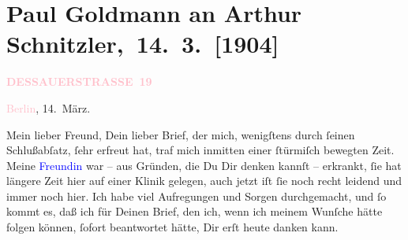 

\renewcommand{\erwaehntePersonen}{Personen: Theodore Rottenberg, Olga Schnitzler, Heinrich Schnitzler}
\renewcommand{\erwaehnteOrte}{Orte: Berlin, Dessauer Straße, Deutsches Theater Berlin, Italien, Neapel, Palermo, Pompei, Rom, Sizilien, Taormina, Wien}
\renewcommand{\erwaehnteWerke}{Werke: Berliner Theater. »Der einsame Weg«. Von Arthur Schnitzler, Der einsame Weg. Schauspiel in fünf Akten, Neue Freie Presse}
\section[ Paul Goldmann an Arthur Schnitzler, 14. 3. {[}1904{]}]{Paul Goldmann an Arthur Schnitzler, 14. 3. {[}1904{]}}
\nopagebreak{}
\rehead{ }\normalsize\beginnumbering{}
\toendnotes[C]{\smallbreak\pagebreak[2]}
\toendnotes[C]{\smallbreak}
\pstart
           \noindent{}\raggedleft{}{\pb}\textcolor{gray}{\textbf{\textcolor{pink}{DESSAUERSTRASSE 19}{}\ledrightnote{\textcolor{pink}{Dessauer Straße}}}}\pend
           
\pstart
           \textcolor{pink}{Berlin}{}\ledrightnote{\textcolor{pink}{Berlin}}, 14. März.\pend
           
\pstart{}Mein lieber Freund,\pend
\pstart
           Dein lieber Brief, der mich, wenigſtens durch ſeinen Schlußabſatz, ſehr erfreut hat,
               traf mich inmitten einer ſtürmiſch  bewegten Zeit.
               Meine \textcolor{blue}{Freundin}{}\ledrightnote{{$\rightarrow$}\textcolor{blue}{Theodore Rottenberg}} war – aus
               Gründen, die Du Dir denken kannſt – erkrankt,  ſie
               hat längere Zeit hier auf einer Klinik gelegen, auch jetzt iſt ſie noch recht leidend
               und immer noch hier. Ich habe viel Aufregungen und Sorgen durchgemacht, und ſo kommt
               es, daß ich \introOben{}für\introOben{} Deinen Brief, den ich, wenn ich meinem
               Wunſche hätte \strikeout{\textcolor{gray}{erf}} folgen können, ſofort beantwortet hätte, Dir erſt heute danken kann.\pend
           
